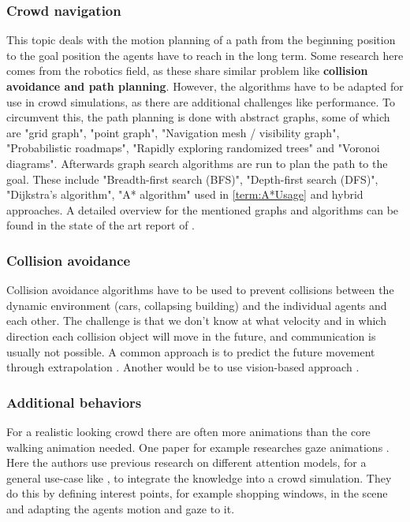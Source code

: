 \documentclass{acmsiggraph}               %
\begin{document}
\subsubsection{Crowd navigation}
This topic deals with the motion planning of a path from the beginning position to the goal position the agents have to reach in the long term. Some research here comes from the robotics field, as these share similar problem like \textbf{collision avoidance and path planning}. However, the algorithms have to be adapted for use in crowd simulations, as there are additional challenges like performance. To circumvent this, the path planning is done with abstract graphs, some of which are "grid graph", "point graph", "Navigation mesh / visibility graph", "Probabilistic roadmaps", "Rapidly exploring randomized trees" and "Voronoi diagrams". Afterwards graph search algorithms are run to plan the path to the goal. These include "Breadth-ﬁrst search (BFS)",  "Depth-ﬁrst search (DFS)", "Dijkstra’s algorithm", "A* algorithm" used in \ref{term:A*Usage} and hybrid approaches. A detailed overview for the mentioned graphs and algorithms can be found in the state of the art report of \cite{jaros_crowd_2014}. 

\subsubsection{Collision avoidance}
Collision avoidance algorithms have to be used to prevent collisions between the dynamic environment (cars, collapsing building) and the individual agents and each other. The challenge is that we don't know at what velocity and in which direction each collision object will move in the future, and communication is usually not possible. 
A common approach is to predict the future movement through extrapolation \cite{karamouzas_predictive_2009}. Another would be to use vision-based approach \cite{ondrej_synthetic-vision_2010}.

\subsubsection{Additional behaviors}
For a realistic looking crowd there are often more animations than the core walking animation needed. One paper for example researches gaze animations \cite{grillon_simulating_2009}. 
Here the authors use previous research on different attention models, for a general use-case like \cite{peters_model_2005}, to integrate the knowledge into a crowd simulation. They do this by defining interest points, for example shopping windows, in the scene and adapting the agents motion and gaze to it. 
\end{document}

